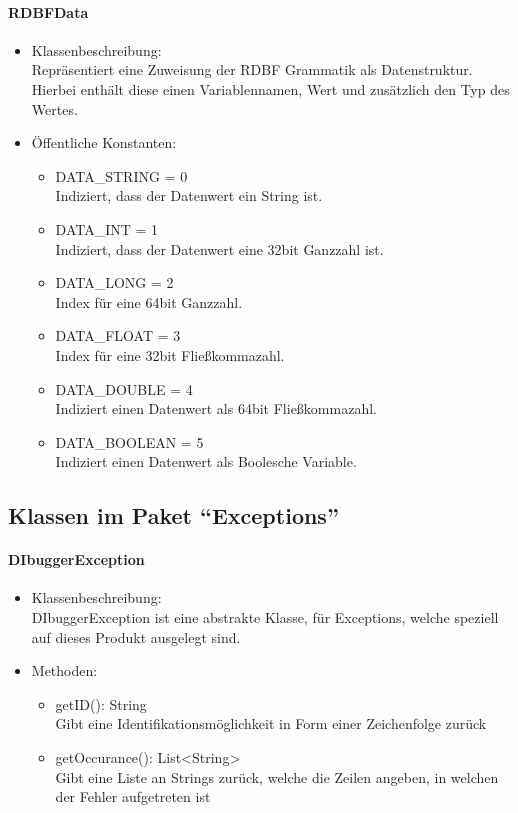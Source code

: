 \documentclass[parskip=full]{scrartcl}
\begin{document}
\paragraph{RDBFData}
\begin{itemize}
\item Klassenbeschreibung: \\
Repräsentiert eine Zuweisung der RDBF Grammatik als Datenstruktur. Hierbei enthält diese einen Variablennamen, Wert und zusätzlich den Typ des Wertes.
\item Öffentliche Konstanten: \\
\begin{itemize}
\item DATA\_STRING = 0 \\
Indiziert, dass der Datenwert ein String ist.
\item DATA\_INT = 1 \\
Indiziert, dass der Datenwert eine 32bit Ganzzahl ist.
\item DATA\_LONG = 2 \\
Index für eine 64bit Ganzzahl.
\item DATA\_FLOAT = 3 \\
Index für eine 32bit Fließkommazahl.
\item DATA\_DOUBLE = 4 \\
Indiziert einen Datenwert als 64bit Fließkommazahl.
\item DATA\_BOOLEAN = 5 \\
Indiziert einen Datenwert als Boolesche Variable.
\end{itemize}
\end{itemize}


\subsection{Klassen im Paket \enquote{Exceptions}} 
\paragraph{DIbuggerException}
\begin{itemize}
\item Klassenbeschreibung: \\
DIbuggerException ist eine abstrakte Klasse, für Exceptions, welche speziell auf dieses Produkt ausgelegt sind.
\item Methoden: \\
\begin{itemize}
\item getID(): String \\
Gibt eine Identifikationsmöglichkeit in Form einer Zeichenfolge zurück
\item getOccurance(): List<String> \\
Gibt eine Liste an Strings zurück, welche die Zeilen angeben, in welchen der Fehler aufgetreten ist
\end{itemize}
\end{itemize}
\end{document}
